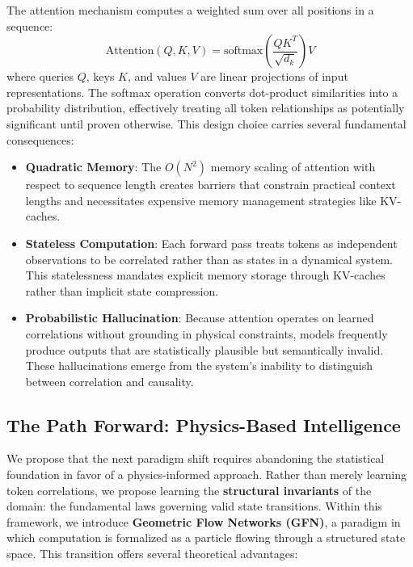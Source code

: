 \documentclass[12pt,a4paper]{article}
\begin{document}
The attention mechanism computes a weighted sum over all positions in a sequence:
\begin{equation}
    \text{Attention}(Q, K, V) = \text{softmax}\left(\frac{QK^T}{\sqrt{d_k}}\right)V
    \label{eq:attention}
\end{equation}
where queries $Q$, keys $K$, and values $V$ are linear projections of input representations. The softmax operation converts dot-product similarities into a probability distribution, effectively treating all token relationships as potentially significant until proven otherwise. This design choice carries several fundamental consequences:

\begin{itemize}
    \item \textbf{Quadratic Memory}: The $O(N^2)$ memory scaling of attention with respect to sequence length creates barriers that constrain practical context lengths and necessitates expensive memory management strategies like KV-caches.

    \item \textbf{Stateless Computation}: Each forward pass treats tokens as independent observations to be correlated rather than as states in a dynamical system. This statelessness mandates explicit memory storage through KV-caches rather than implicit state compression.

    \item \textbf{Probabilistic Hallucination}: Because attention operates on learned correlations without grounding in physical constraints, models frequently produce outputs that are statistically plausible but semantically invalid. These hallucinations emerge from the system's inability to distinguish between correlation and causality.
\end{itemize}

\subsection{The Path Forward: Physics-Based Intelligence}
\label{sec:path-forward}

We propose that the next paradigm shift requires abandoning the statistical foundation in favor of a physics-informed approach. Rather than merely learning token correlations, we propose learning the \textbf{structural invariants} of the domain: the fundamental laws governing valid state transitions. Within this framework, we introduce \textbf{Geometric Flow Networks (GFN)}, a paradigm in which computation is formalized as a particle flowing through a structured state space. This transition offers several theoretical advantages:
\end{document}
